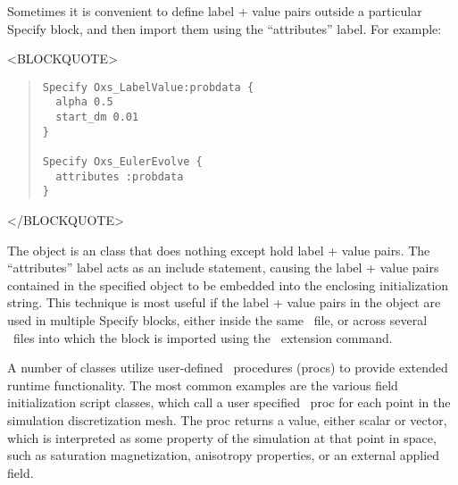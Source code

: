 %
\label{par:specifyAttributes}
Sometimes it is convenient to define label + value pairs outside a
particular Specify block, and then import them using the
``attributes'' label.  For example:
\begin{rawhtml}
<BLOCKQUOTE>
\end{rawhtml}
\begin{quote}
\begin{verbatim}
Specify Oxs_LabelValue:probdata {
  alpha 0.5
  start_dm 0.01
}

Specify Oxs_EulerEvolve {
  attributes :probdata
}
\end{verbatim}
\end{quote}
\begin{rawhtml}
</BLOCKQUOTE>
\end{rawhtml}
The  object is an  class that does
nothing except hold label + value pairs.  The ``attributes'' label acts as an
include statement, causing the label + value pairs contained in the
specified  object to be embedded into the enclosing
 initialization string.  This technique is most useful if the
label + value pairs in the  object are used in
multiple Specify blocks, either inside the same \MIF\ file, or
across several \MIF\ files into which the  block is
imported using the  \MIF\ extension command.

%
\label{par:supportProcs}
A number of  classes utilize user-defined \Tcl\
procedures (procs) to provide extended runtime functionality.  The
most common examples are the various field initialization script
classes, which call a user specified \Tcl\ proc for each point in the
simulation discretization mesh.  The proc returns a value, either
scalar or vector, which is interpreted as some property of the
simulation at that point in space, such as saturation magnetization,
anisotropy properties, or an external applied field.


